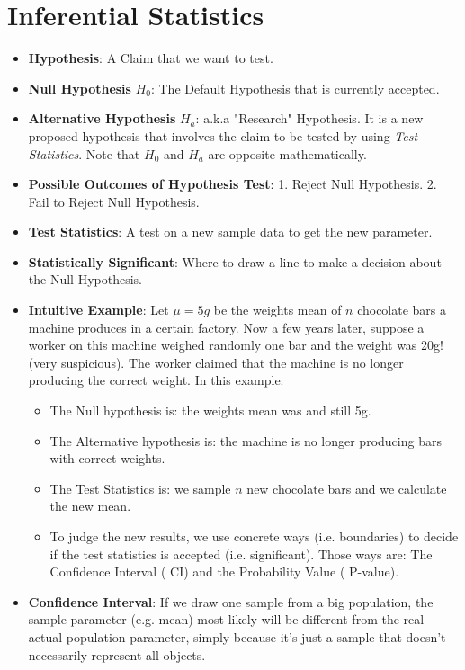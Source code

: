 \documentclass[11pt, twocolumn]{article}
\begin{document}
\section{Inferential Statistics}
\begin{itemize}
\item \textbf{Hypothesis}: A {\color{blue} Claim} that we want to test.
\item \textbf{Null Hypothesis} $H_0$: The {\color{blue} Default} Hypothesis that is currently accepted.
\item \textbf{Alternative Hypothesis} $H_a$: a.k.a "Research" Hypothesis. It is a {\color{blue} new proposed hypothesis} that involves the claim to be tested by using \textit{Test Statistics}. Note that $H_0$ and $H_a$ are {\color{red} opposite} mathematically.
\item \textbf{Possible Outcomes of Hypothesis Test}: 1. {\color{blue} Reject} Null Hypothesis.  2. {\color{blue} Fail to Reject} Null Hypothesis.
\item \textbf{Test Statistics}: A test on a new sample data to get the {\color{blue} new parameter}.
\item \textbf{Statistically Significant}: Where to draw a line to make a {\color{blue} decision} about the Null Hypothesis.
\item \textbf{Intuitive Example}: Let $\mu = 5g$ be the weights mean of $n$ chocolate bars a machine produces in a certain factory. Now a few years later, suppose a worker on this machine weighed randomly one bar and the weight was 20g! (very suspicious). The worker claimed that the machine is no longer producing the correct weight.
In this example: 
\begin{itemize}
\item The Null hypothesis is: the weights mean was and {\color{blue} still} 5g.
\item The Alternative hypothesis is: the machine is {\color{red} no longer} producing bars with correct weights.
\item The Test Statistics is: we sample $n$ {\color{blue} new} chocolate bars and we calculate the {\color{blue} new mean}.
\item To judge the new results, we use {\color{blue} concrete way}s (i.e. boundaries) to decide if the test statistics is {\color{blue} accepted} (i.e. significant). Those ways are: The Confidence Interval ({\color{blue} CI}) and the Probability Value ({\color{blue} P-value}). 
\end{itemize}
\item \textbf{Confidence Interval}: If we draw one sample from a big population, the sample parameter (e.g. mean) most likely will be different from the real actual population parameter, simply because it's just a sample that doesn't necessarily represent all objects.\\

\end{itemize}
\end{document}
